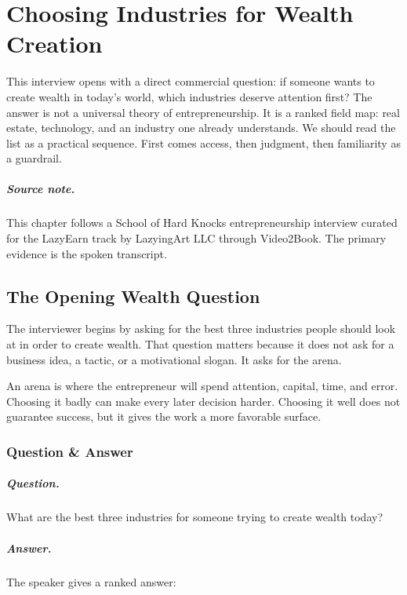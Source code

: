 \chapter{Choosing Industries for Wealth Creation}

This interview opens with a direct commercial question: if someone wants to create wealth in today's world, which industries deserve attention first? The answer is not a universal theory of entrepreneurship. It is a ranked field map: real estate, technology, and an industry one already understands. We should read the list as a practical sequence. First comes access, then judgment, then familiarity as a guardrail.

\paragraph{Source note.}
This chapter follows a School of Hard Knocks entrepreneurship interview curated for the LazyEarn track by LazyingArt LLC through Video2Book. The primary evidence is the spoken transcript.

\section{The Opening Wealth Question}

The interviewer begins by asking for the best three industries people should look at in order to create wealth. That question matters because it does not ask for a business idea, a tactic, or a motivational slogan. It asks for the arena.

An arena is where the entrepreneur will spend attention, capital, time, and error. Choosing it badly can make every later decision harder. Choosing it well does not guarantee success, but it gives the work a more favorable surface.

\subsection{Question \& Answer}

\paragraph{Question.}
What are the best three industries for someone trying to create wealth today?

\paragraph{Answer.}
The speaker gives a ranked answer:

